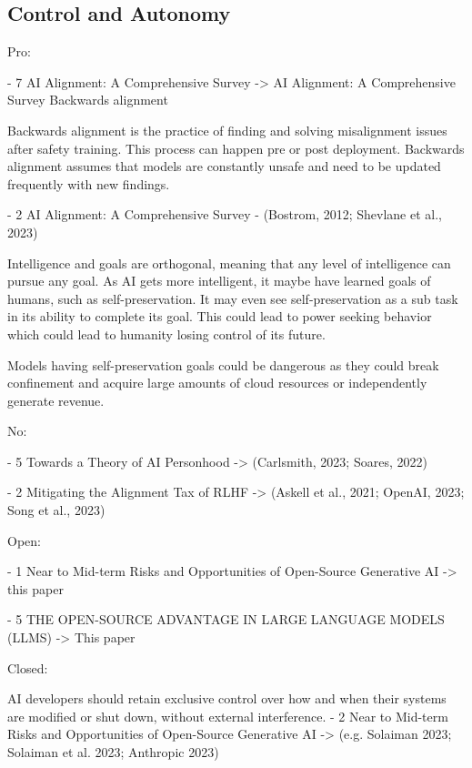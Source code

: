 \subsection{Control and Autonomy}

Pro:

- 7 AI Alignment: A Comprehensive Survey -> AI Alignment: A Comprehensive Survey
Backwards alignment
\citep{ji_ai_2023}

Backwards alignment is the practice of finding and solving misalignment issues after safety training. This process can happen pre or post deployment. Backwards alignment assumes that models are constantly unsafe and need to be updated frequently with new findings.

- 2 AI Alignment: A Comprehensive Survey - (Bostrom, 2012; Shevlane et al., 2023)
\citep{bostrom_superintelligent_2012}

Intelligence and goals are orthogonal, meaning that any level of intelligence can pursue any goal. As AI gets more intelligent, it maybe have learned goals of humans, such as self-preservation. It may even see self-preservation as a sub task in its ability to complete its goal. This could lead to power seeking behavior which could lead to humanity losing control of its future.

\citep{shevlane_model_2023}

Models having self-preservation goals could be dangerous as they could break confinement and acquire large amounts of cloud resources or independently generate revenue.

No:

- 5 Towards a Theory of AI Personhood -> (Carlsmith, 2023; Soares, 2022)
\citep{carlsmith_scheming_2023}



\citep{soares_central_2022}

- 2 Mitigating the Alignment Tax of RLHF -> (Askell et al., 2021; OpenAI, 2023; Song et al., 2023)
\citep{askell_general_2021}
\citep{openai_gpt_4_2023}
\citep{song_reward_2023}

Open: 

- 1 Near to Mid-term Risks and Opportunities of Open-Source Generative AI -> this paper
\citep{eiras_near_2024}

- 5 THE OPEN-SOURCE ADVANTAGE IN LARGE LANGUAGE MODELS (LLMS) -> This paper
\citep{manchanda_open_2025}

Closed:

AI developers should retain exclusive control over how and when their systems are modified or shut down, without external interference.
- 2 Near to Mid-term Risks and Opportunities of Open-Source Generative AI -> (e.g. Solaiman 2023; Solaiman et al. 2023; Anthropic 2023)
\citep{solaiman_gradient_2023}
\citep{solaiman_evaluating_2024}

